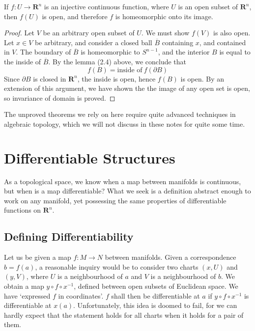 \begin{theorem}
    If $f:U \to \mathbf{R}^n$ is an injective continuous function, where $U$ is an open subset of $\mathbf{R}^n$, then $f(U)$ is open, and therefore $f$ is homeomorphic onto its image.
\end{theorem}
\begin{proof}
    Let $V$ be an arbitrary open subset of $U$. We must show $f(V)$ is also open. Let $x \in V$ be arbitrary, and consider a closed ball $\overline{B}$ containing $x$, and contained in $V$. The boundary of $\overline{B}$ is homeomorphic to $S^{n-1}$, and the interior $B$ is equal to the inside of $\overline{B}$. By the lemma (2.4) above, we conclude that
    \[ f(B) = \text{inside of}\ f(\partial B) \]
    Since $\partial B$ is closed in $\mathbf{R}^n$, the inside is open, hence $f(B)$ is open. By an extension of this argument, we have shown the the image of any open set is open, so invariance of domain is proved.
\end{proof}

The unproved theorems we rely on here require quite advanced techniques in algebraic topology, which we will not discuss in these notes for quite some time.








\chapter{Differentiable Structures}

As a topological space, we know when a map between manifolds is continuous, but when is a map differentiable? What we seek is a definition abstract enough to work on any manifold, yet possessing the same properties of differentiable functions on $\mathbf{R}^n$.

\section{Defining Differentiability}

Let us be given a map $f:M \to N$ between manifolds. Given a correspondence $b = f(a)$, a reasonable inquiry would be to consider two charts $(x,U)$ and $(y,V)$, where $U$ is a neighbourhood of $a$ and $V$ is a neighbourhood of $b$. We obtain a map $y \circ f \circ x^{-1}$, defined between open subsets of Euclidean space. We have `expressed $f$ in coordinates'. $f$ shall then be differentiable at $a$ if $y \circ f \circ x^{-1}$ is differentiable at $x(a)$. Unfortunately, this idea is doomed to fail, for we can hardly expect that the statement holds for all charts when it holds for a pair of them.


